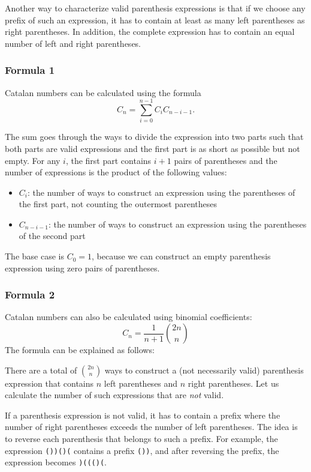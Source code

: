Another way to characterize valid 
parenthesis expressions is that if
we choose any prefix of such an expression,
it has to contain at least as many left
parentheses as right parentheses.
In addition, the complete expression has to
contain an equal number of left and right
parentheses.

\subsubsection{Formula 1}

Catalan numbers can be calculated using the formula
\[ C_n = \sum_{i=0}^{n-1} C_{i} C_{n-i-1}.\]

The sum goes through the ways to divide the
expression into two parts
such that both parts are valid
expressions and the first part is as short as possible
but not empty.
For any $i$, the first part contains $i+1$ pairs
of parentheses and the number of expressions
is the product of the following values:

\begin{itemize}
\item $C_{i}$: the number of ways to construct an expression
using the parentheses of the first part,
not counting the outermost parentheses
\item $C_{n-i-1}$: the number of ways to construct an
expression using the parentheses of the second part
\end{itemize}

The base case is $C_0=1$,
because we can construct an empty parenthesis
expression using zero pairs of parentheses.

\subsubsection{Formula 2}

Catalan numbers can also be calculated
using binomial coefficients:
\[ C_n = \frac{1}{n+1} {2n \choose n}\]
The formula can be explained as follows:

There are a total of ${2n \choose n}$ ways
to construct a (not necessarily valid)
parenthesis expression that contains $n$ left
parentheses and $n$ right parentheses.
Let us calculate the number of such
expressions that are \emph{not} valid.

If a parenthesis expression is not valid,
it has to contain a prefix where the
number of right parentheses exceeds the
number of left parentheses.
The idea is to reverse each parenthesis
that belongs to such a prefix.
For example, the expression
\texttt{())()(} contains a prefix \texttt{())},
and after reversing the prefix,
the expression becomes \texttt{)((()(}.

